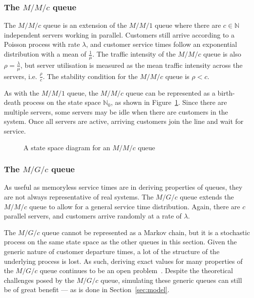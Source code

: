 \subsubsection{The \(M/M/c\) queue}

The \(M/M/c\) queue is an extension of the \(M/M/1\) queue where there are \(c
\in \mathbb N\) independent servers working in parallel. Customers still arrive
according to a Poisson process with rate \(\lambda\), and customer service times
follow an exponential distribution with a mean of \(\frac{1}{\mu}\). The traffic
intensity of the \(M/M/c\) queue is also \(\rho = \frac{\lambda}{\mu}\), but
server utilisation is measured as the mean traffic intensity across the servers,
i.e.  \(\frac{\rho}{c}\). The stability condition for the \(M/M/c\) queue is
\(\rho < c\). 

As with the \(M/M/1\) queue, the \(M/M/c\) queue can be represented as a
birth-death process on the state space \(\mathbb N_0\), as shown in
Figure~\ref{fig:birth_death_mmc}. Since there are multiple servers, some servers
may be idle when there are customers in the system. Once all servers are active,
arriving customers join the line and wait for service. 

\begin{figure}[htbp]
    \centering
    \resizebox{\imgwidth}{!}{%
        
    }\caption{
        A state space diagram for an \(M/M/c\) queue%
    }\label{fig:birth_death_mmc}
\end{figure}

\subsubsection{The \(M/G/c\) queue}

As useful as memoryless service times are in deriving properties of queues, they
are not always representative of real systems. The \(M/G/c\) queue extends the
\(M/M/c\) queue to allow for a general service time distribution. Again, there
are \(c\) parallel servers, and customers arrive randomly at a rate of
\(\lambda\).

The \(M/G/c\) queue cannot be represented as a Markov chain, but it is a
stochastic process on the same state space as the other queues in this section.
Given the generic nature of customer departure times, a lot of the structure of
the underlying process is lost. As such, deriving exact values for many
properties of the \(M/G/c\) queue continues to be an open
problem~\cite{Kingman2009}. Despite the theoretical challenges posed by the
\(M/G/c\) queue, simulating these generic queues can still be of great benefit
--- as is done in Section~\ref{sec:model}. 

